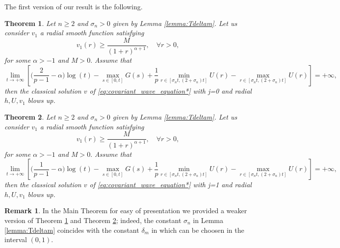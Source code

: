 \documentclass[11pt,reqno]{amsart}
\newtheorem{theorem}{Theorem}
\theoremstyle{definition}
\newtheorem{remark}{Remark}
\numberwithin{equation}{section}
\begin{document}
The first version of our result is the following.
\begin{theorem}
\label{th.main}
Let $n\geq 2$ and $\sigma_n>0$ given by Lemma \ref{lemma:Tdeltam}. Let us consider $v_1$ a radial smooth function satisfying 
\begin{equation}\label{eq:data_assumption}
    v_1(r)\geq \frac{M}{(1+r)^{\alpha+1}}, \quad \forall r>0,
\end{equation}
for some $\alpha>-1$ and $M>0.$ Assume that 
\begin{equation}\label{eq:interaction}
    \lim_{t\to+\infty} \left[\Big(\frac{2}{p-1}-\alpha\Big)\log(t)-\max_{s\in [0,t]}G(s)
    +\frac{1}{p} \min_{r\in [\sigma_n t,(2+\sigma_n)t]} U(r) -\max_{r\in [\sigma_n t,(2+\sigma_n)t]} U(r)\right]=+\infty,
\end{equation}
then the classical solution $v$ of \eqref{eq:covariant_wave_equation*}  with j=0 and radial $h,U,v_1$ blows up.
\end{theorem}
%
\begin{theorem}\label{th.main.derivative}
Let $n\geq 2$ and $\sigma_n>0$ given by Lemma \ref{lemma:Tdeltam}. Let us consider $v_1$ a radial smooth function satisfying 
\begin{equation}\label{eq:data_assumption_derivative}
    v_1(r)\geq \frac{M}{(1+r)^{\alpha+1}}, \quad \forall r>0,
\end{equation}
for some $\alpha>-1$ and $M>0.$ Assume that 
\begin{equation}\label{eq:interaction_derivative}
    \lim_{t\to+\infty} \left[\Big(\frac{1}{p-1}-\alpha\Big)\log(t)-\max_{s\in [0,t]}G(s)
    +\frac{1}{p} \min_{r\in [\sigma_n t,(2+\sigma_n)t]} U(r) -\max_{r\in [\sigma_n t,(2+\sigma_n)t]} U(r)\right]=+\infty,
\end{equation}
then the classical solution $v$ of \eqref{eq:covariant_wave_equation*}  with j=1 and radial $h,U,v_1$ blows up.
\end{theorem}
\begin{remark}
\label{rem:sigma_n}
In the Main Theorem for easy of presentation we provided a weaker version of Theorem \ref{th.main} and Theorem \ref{th.main.derivative}; indeed, the constant $\sigma_n$ in Lemma \ref{lemma:Tdeltam} coincides with the constant $\delta_m$ in  \cite[Lemma 2.5]{takamura1995} which can be choosen in the interval $(0,1)$.
\end{remark}
\end{document}
